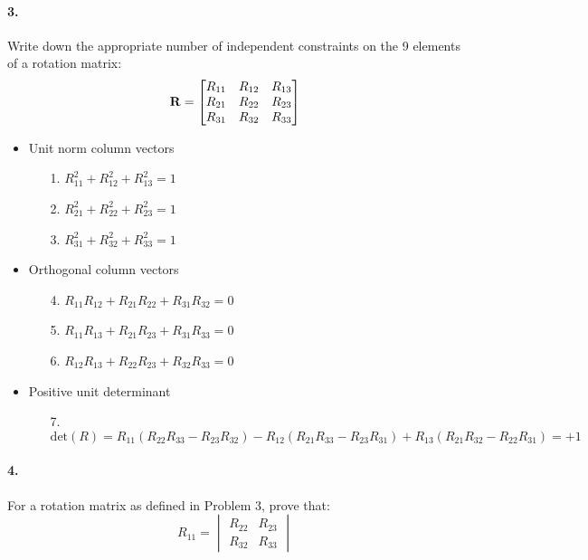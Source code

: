 \documentclass[english]{article}
\begin{document}
\paragraph{3.}

Write down the appropriate number of  independent constraints on the 9 elements of a rotation matrix: 
\[
{\bf R} = \begin{bmatrix} 
			R_{11} & R_{12} & R_{13}  \\
			R_{21} & R_{22} & R_{23}  \\
			R_{31} & R_{32} & R_{33}
		\end{bmatrix}
\]

\begin{itemize}
\item Unit norm column vectors
\begin{itemize}
\item[1.] $ R_{11}^2 + R_{12}^2 + R_{13}^2 = 1$
\item[2.] $ R_{21}^2 + R_{22}^2 + R_{23}^2 = 1$
\item[3.] $ R_{31}^2 + R_{32}^2 + R_{33}^2 = 1$
\end{itemize}
\item Orthogonal column vectors
\begin{itemize}
\item[4.] $ R_{11} R_{12} + R_{21} R_{22} + R_{31} R_{32} = 0$
\item[5.] $ R_{11} R_{13} + R_{21} R_{23} + R_{31} R_{33} = 0$
\item[6.] $ R_{12} R_{13} + R_{22} R_{23} + R_{32} R_{33} = 0$
\end{itemize}
\item Positive unit determinant
\begin{itemize}
\item[7.] $\mathrm{det}(R) = R_{11}(R_{22}R_{33} - R_{23}R_{32}) - R_{12}(R_{21}R_{33} - R_{23}R_{31}) + R_{13}(R_{21}R_{32} - R_{22}R_{31})= +1$
\end{itemize}
\end{itemize}

\paragraph{4.} 

For a rotation matrix as defined in Problem 3, prove that: 
\[
R_{11} = \begin{vmatrix}
R_{22} & R_{23}  \\
R_{32} & R_{33} \end{vmatrix}
\]
\end{document}
